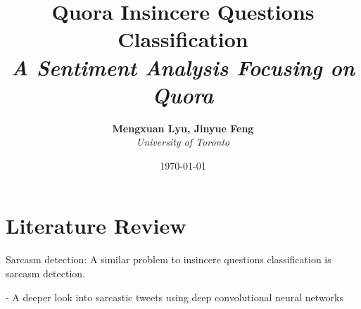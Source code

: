 \documentclass[12pt]{diazessay} %
\title{\textbf{Quora Insincere Questions Classification} \\ {\Large\itshape A Sentiment Analysis Focusing on Quora}} %
\author{\textbf{Mengxuan Lyu, Jinyue Feng} \\ \textit{University of Toronto}} %
\date{\today} %
\begin{document}
\maketitle %






\doublespacing %
\section*{Literature Review}
Sarcasm detection: A similar problem to insincere questions classification is sarcasm detection. 

- A deeper look into sarcastic tweets using deep convolutional neural networks
\citep{poria2017}
\end{document}
